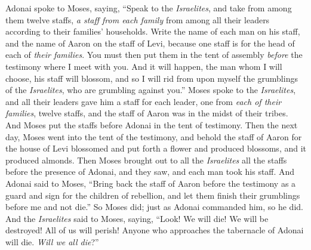 \begin{biblechapter} %
 Adonai spoke to Moses, saying,
\verse “Speak to the \textit{Israelites}, and take from among them twelve staffs, \textit{a staff from each family} from among all their leaders according to their families’ households. Write the name of each man on his staff,
\verse and the name of Aaron on the staff of Levi, because one staff is for the head of each of \textit{their families}.
\verse You must then put them in the tent of assembly \textit{before} the testimony where I meet with you.
\verse And it will happen, the man whom I will choose, his staff will blossom, and so I will rid from upon myself the grumblings of the \textit{Israelites}, who are grumbling against you.”
\verse Moses spoke to the \textit{Israelites}, and all their leaders gave him a staff for each leader, one from \textit{each of their families}, twelve staffs, and the staff of Aaron was in the midst of their tribes.
\verse And Moses put the staffs before Adonai in the tent of testimony.
\verse Then the next day, Moses went into the tent of the testimony, and behold the staff of Aaron for the house of Levi blossomed and put forth a flower and produced blossoms, and it produced almonds.
\verse Then Moses brought out to all the \textit{Israelites} all the staffs before the presence of Adonai, and they saw, and each man took his staff.
\verse And Adonai said to Moses, “Bring back the staff of Aaron before the testimony as a guard and sign for the children of rebellion, and let them finish their grumblings before me and not die.”
\verse So Moses did; just as Adonai commanded him, so he did.
\verse And the \textit{Israelites} said to Moses, saying, “Look! We will die! We will be destroyed! All of us will perish!
\verse Anyone who approaches the tabernacle of Adonai will die. \textit{Will we all die}?”
\end{biblechapter}

